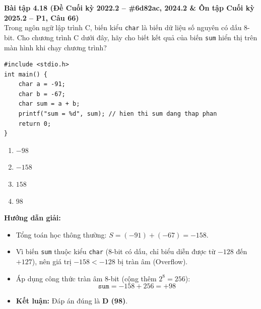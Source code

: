 \textbf{Bài tập 4.18 (Đề Cuối kỳ 2022.2 -- \#6d82ac, 2024.2 \& Ôn tập Cuối kỳ 2025.2 -- P1, Câu 66)}\\
Trong ngôn ngữ lập trình C, biến kiểu \texttt{char} là biến dữ liệu số nguyên có dấu 8-bit. Cho chương trình C dưới đây, hãy cho biết kết quả của biến \texttt{sum} hiển thị trên màn hình khi chạy chương trình?
\begin{lstlisting}
#include <stdio.h>
int main() {
    char a = -91;
    char b = -67;
    char sum = a + b;
    printf("sum = %d", sum); // hien thi sum dang thap phan
    return 0;
}
\end{lstlisting}
\begin{enumerate}[label=\Alph*.]
    \item $-98$
    \item $-158$
    \item $158$
    \item $98$
\end{enumerate}
\textbf{Hướng dẫn giải:}
\begin{itemize}
    \item Tổng toán học thông thường: $S = (-91) + (-67) = -158$.
    \item Vì biến \texttt{sum} thuộc kiểu \texttt{char} (8-bit có dấu, chỉ biểu diễn được từ $-128$ đến $+127$), nên giá trị $-158 < -128$ bị tràn âm (Overflow).
    \item Áp dụng công thức tràn âm 8-bit (cộng thêm $2^8 = 256$):
    $$\texttt{sum} = -158 + 256 = +98$$
    \item \textbf{Kết luận:} Đáp án đúng là \textbf{D (98)}.
\end{itemize}

